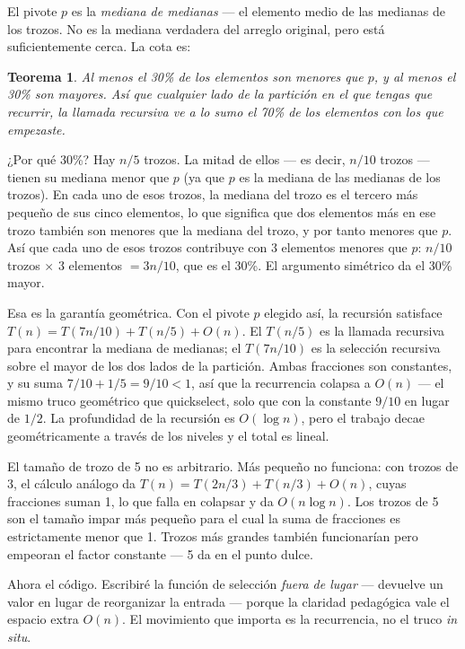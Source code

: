 \documentclass[11pt,a4paper]{article}
\newtheorem{teorema}{Teorema}
\begin{document}
El pivote $p$ es la \emph{mediana de medianas} --- el elemento medio de las medianas de los trozos. No es la mediana verdadera del arreglo original, pero está suficientemente cerca. La cota es:

\begin{teorema}
Al menos el 30\% de los elementos son menores que $p$, y al menos el 30\% son mayores. Así que cualquier lado de la partición en el que tengas que recurrir, la llamada recursiva ve a lo sumo el 70\% de los elementos con los que empezaste.
\end{teorema}

¿Por qué 30\%? Hay $n/5$ trozos. La mitad de ellos --- es decir, $n/10$ trozos --- tienen su mediana menor que $p$ (ya que $p$ es la mediana de las medianas de los trozos). En cada uno de esos trozos, la mediana del trozo es el tercero más pequeño de sus cinco elementos, lo que significa que dos elementos más en ese trozo también son menores que la mediana del trozo, y por tanto menores que $p$. Así que cada uno de esos trozos contribuye con 3 elementos menores que $p$: $n/10$ trozos $\times$ 3 elementos $= 3n/10$, que es el 30\%. El argumento simétrico da el 30\% mayor.

Esa es la garantía geométrica. Con el pivote $p$ elegido así, la recursión satisface $T(n) = T(7n/10) + T(n/5) + O(n)$. El $T(n/5)$ es la llamada recursiva para encontrar la mediana de medianas; el $T(7n/10)$ es la selección recursiva sobre el mayor de los dos lados de la partición. Ambas fracciones son constantes, y su suma $7/10 + 1/5 = 9/10 < 1$, así que la recurrencia colapsa a $O(n)$ --- el mismo truco geométrico que quickselect, solo que con la constante $9/10$ en lugar de $1/2$. La profundidad de la recursión es $O(\log n)$, pero el trabajo decae geométricamente a través de los niveles y el total es lineal.

El tamaño de trozo de 5 no es arbitrario. Más pequeño no funciona: con trozos de 3, el cálculo análogo da $T(n) = T(2n/3) + T(n/3) + O(n)$, cuyas fracciones suman 1, lo que falla en colapsar y da $O(n \log n)$. Los trozos de 5 son el tamaño impar más pequeño para el cual la suma de fracciones es estrictamente menor que 1. Trozos más grandes también funcionarían pero empeoran el factor constante --- 5 da en el punto dulce.

Ahora el código. Escribiré la función de selección \emph{fuera de lugar} --- devuelve un valor en lugar de reorganizar la entrada --- porque la claridad pedagógica vale el espacio extra $O(n)$. El movimiento que importa es la recurrencia, no el truco \emph{in situ}.
\end{document}
